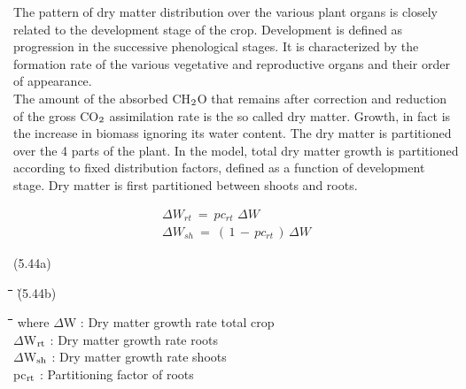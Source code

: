 \documentclass[11pt]{article}
\begin{document}
\bigskip
\bigskip
The pattern of dry matter distribution over the various plant organs is closely related to
the development stage of the crop. Development is defined as progression in the success\-ive {\nobreak}phenological stages. It is characterized by the formation rate of the various vegetative
and reproductive organs and their order of appearance.\\
The amount of the absorbed CH$_{{\rm 2}}$O that remains after correction and reduction of the
gross CO$_{{\rm 2}}$ assimilation rate is the so called dry matter. Growth, in fact is the increase in
biomass ignoring its water content. The dry matter is partitioned over the 4 parts of the
plant. In the model, total dry matter growth is parti\-tioned according to fixed distribution
factors, defined as a function of develop\-ment stage. Dry matter is first partitioned
between shoots and roots. 

\begin{eqnarray*}
\Delta W _{rt} ~=~ pc _{rt} \,\,\Delta W   \nonumber  \\
\Delta W _{sh} ~=~ (\, 1\, -\, pc _{rt} \, )\,\Delta W
\end{eqnarray*}

 \bigskip
\strut\hfill (5.44a)\nwln
\begin{tabbing}
\hspace{1.27cm}\=\hspace{1.27cm}\=\hspace{1.27cm}\=\hspace{1.27cm}\=%
\hspace{1.27cm}\=\hspace{1.27cm}\=\hspace{1.27cm}\=\hspace{1.27cm}\=%
\hspace{1.27cm}\=\hspace{1.27cm}\=\kill
\>\>\>\>\> \> \> \`(5.44b)
\end{tabbing}
\nwln
\begin{tabbing}
\hspace{1.27cm}\=\hspace{1.27cm}\=\hspace{1.27cm}\=\hspace{1.27cm}\=%
\hspace{1.27cm}\=\hspace{1.27cm}\=\hspace{1.27cm}\=\hspace{1.27cm}\=%
\hspace{1.27cm}\=\hspace{1.27cm}\=\kill
where\> $\Delta$W\> : Dry matter growth rate total crop\> \> \> \> \> \> \> \> [kg ha$^{{\rm -1}}$ d$^{{\rm -1}}$]\\
\>$\Delta$W$_{{\rm rt}}$\> : Dry matter growth rate roots\> \> \> \> \> \> \> \> [kg ha$^{{\rm -1}}$ d$^{{\rm -1}}$]\\
\>$\Delta$W$_{{\rm sh}}$\> : Dry matter growth rate shoots\> \> \> \> \> \> \> \> [kg ha$^{{\rm -1}}$ d$^{{\rm -1}}$]\\
\>pc$_{{\rm rt}}$\> : Parti\-tioning factor of roots\> \> \> \> \> \> \> \> [kg kg$^{{\rm -1}}$]
\end{tabbing}
\end{document}
